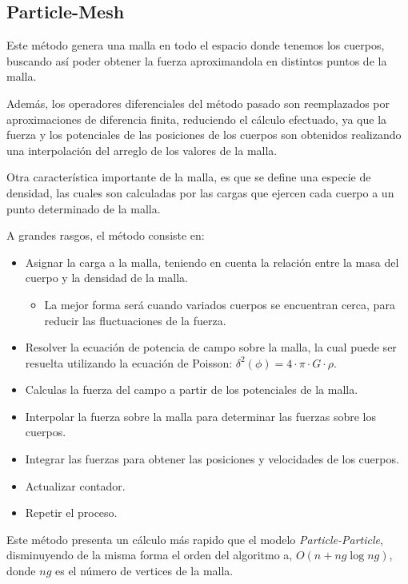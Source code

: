 \subsection{Particle-Mesh}

Este método genera una malla en todo el espacio donde tenemos los cuerpos,
buscando así poder obtener la fuerza aproximandola en distintos
puntos de la malla.

Además, los operadores diferenciales del método pasado son reemplazados por
aproximaciones de diferencia finita, reduciendo el cálculo efectuado,
ya que la fuerza y los potenciales de las posiciones de los cuerpos
son obtenidos realizando una interpolación del arreglo de
los valores de la malla.

Otra característica importante de la malla, es que se define una especie
de densidad, las cuales son calculadas por las cargas que ejercen
cada cuerpo a un punto determinado de la malla.

A grandes rasgos, el método consiste en:
\begin{itemize}
	\item Asignar la carga a la malla, teniendo en cuenta la relación entre
		la masa del cuerpo y la densidad de la malla.
		\begin{itemize}
			\item La mejor forma será cuando variados cuerpos se encuentran
				cerca, para reducir las fluctuaciones de la fuerza.
		\end{itemize}
	\item Resolver la ecuación de potencia de campo sobre la malla,
		la cual puede ser resuelta utilizando la ecuación de Poisson: $\delta^{2} (\phi) = 4\cdot \pi \cdot G \cdot \rho$.
	\item Calculas la fuerza del campo a partir de los potenciales de la malla.
	\item Interpolar la fuerza sobre la malla para determinar las fuerzas
		sobre los cuerpos.
	\item Integrar las fuerzas para obtener las posiciones y velocidades
		de los cuerpos.
	\item Actualizar contador.
	\item Repetir el proceso.
\end{itemize}

Este método presenta un cálculo más rapido que el modelo \emph{Particle-Particle},
disminuyendo de la misma forma el orden del algoritmo a, $O(n + ng \log ng)$,
donde $ng$ es el número de vertices de la malla.

